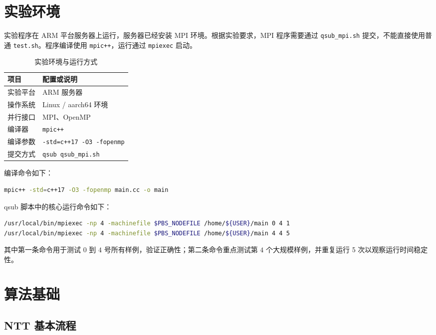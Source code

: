 \documentclass[a4paper]{article}
\begin{document}
\section{实验环境}

实验程序在 ARM 平台服务器上运行，服务器已经安装 MPI 环境。根据实验要求，MPI 程序需要通过 \texttt{qsub\_mpi.sh} 提交，不能直接使用普通 \texttt{test.sh}。程序编译使用 \texttt{mpic++}，运行通过 \texttt{mpiexec} 启动。

\begin{table}[H]
  \centering
  \caption{实验环境与运行方式}
  \label{tab:env}
  \begin{tabular}{l l}
    \toprule
    项目 & 配置或说明 \\
    \midrule
    实验平台 & ARM 服务器 \\
    操作系统 & Linux / aarch64 环境 \\
    并行接口 & MPI、OpenMP \\
    编译器 & \texttt{mpic++} \\
    编译参数 & \texttt{-std=c++17 -O3 -fopenmp} \\
    提交方式 & \texttt{qsub qsub\_mpi.sh} \\
    \bottomrule
  \end{tabular}
\end{table}

编译命令如下：
\begin{lstlisting}[language=bash]
mpic++ -std=c++17 -O3 -fopenmp main.cc -o main
\end{lstlisting}

qsub 脚本中的核心运行命令如下：
\begin{lstlisting}[language=bash]
/usr/local/bin/mpiexec -np 4 -machinefile $PBS_NODEFILE /home/${USER}/main 0 4 1
/usr/local/bin/mpiexec -np 4 -machinefile $PBS_NODEFILE /home/${USER}/main 4 4 5
\end{lstlisting}

其中第一条命令用于测试 $0$ 到 $4$ 号所有样例，验证正确性；第二条命令重点测试第 $4$ 个大规模样例，并重复运行 5 次以观察运行时间稳定性。

\section{算法基础}

\subsection{NTT 基本流程}
\end{document}
